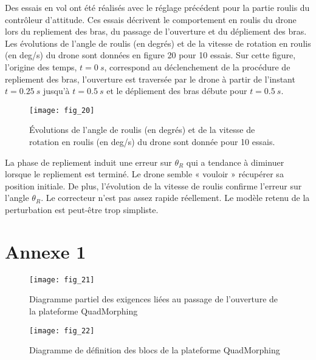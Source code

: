 Des essais en vol ont été réalisés avec le réglage précédent pour la partie roulis du contrôleur
d’attitude. Ces essais décrivent le comportement en roulis du drone lors du repliement des
bras, du passage de l’ouverture et du dépliement des bras. Les évolutions de l’angle de
roulis (en degrés) et de la vitesse de rotation en roulis (en \si{deg/s}) du drone sont données
en figure 20 pour 10 essais. Sur cette figure, l’origine des temps, $t = \SI{0}{s}$, correspond au
déclenchement de la procédure de repliement des bras, l’ouverture est traversée par le drone
à partir de l’instant $t = \SI{0,25}{s}$ jusqu’à $t = \SI{0,5}{s}$ et le dépliement des bras débute pour $t = \SI{0,5}{s}$.

\begin{figure}[H]
\centering
\texttt{[image: fig\_20]}
\caption{\label{fig_ccinppsi2022:20} ­Évolutions de l’angle de roulis (en degrés) et de la vitesse de rotation en roulis
(en \si{deg/s}) du drone sont donnée pour 10 essais.}
\end{figure}

\ifprof
\begin{corrige}
La phase de repliement induit une erreur sur $\theta_R$ qui a tendance à diminuer lorsque le repliement est terminé. Le drone semble « vouloir » récupérer sa position initiale. 
De plus, l’évolution de la vitesse de roulis confirme l’erreur sur l’angle $\theta_R$.
Le correcteur n’est pas assez rapide réellement. Le modèle retenu de la perturbation est peut-être trop simpliste.

\end{corrige}
\else
\fi


\newpage

\section*{Annexe 1}


\begin{figure}[H]
\centering
\texttt{[image: fig\_21]}
\caption{\label{fig_ccinppsi2022:21} Diagramme partiel des exigences liées au passage de l’ouverture de la plateforme QuadMorphing}
\end{figure}

\begin{figure}[H]
\centering
\texttt{[image: fig\_22]}
\caption{\label{fig_ccinppsi2022:22} Diagramme de définition des blocs de la plateforme QuadMorphing}
\end{figure}
